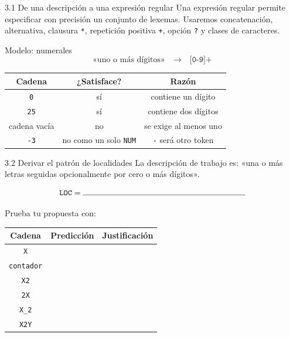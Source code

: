 \documentclass[11pt,spanish]{article}
\newcommand{\blank}[1][4cm]{\rule{#1}{0.4pt}}
\begin{document}
\begin{estacion}{3.1 De una descripción a una expresión regular}
Una expresión regular permite especificar con precisión un conjunto de lexemas. Usaremos concatenación, alternativa, clausura \texttt{*}, repetición positiva \texttt{+}, opción \texttt{?} y clases de caracteres.
\end{estacion}

\begin{modelo}{Modelo: numerales}
\[
\text{«uno o más dígitos»}
\quad\longrightarrow\quad
\texttt{[0-9]+}
\]

\begin{center}
\begin{tabular}{|c|c|c|}
\hline
\textbf{Cadena} & \textbf{¿Satisface?} & \textbf{Razón} \\
\hline
\texttt{0} & sí & contiene un dígito \\
\hline
\texttt{25} & sí & contiene dos dígitos \\
\hline
cadena vacía & no & se exige al menos uno \\
\hline
\texttt{-3} & no como un solo \texttt{NUM} & \texttt{-} será otro token \\
\hline
\end{tabular}
\end{center}
\end{modelo}

\begin{estacion}{3.2 Derivar el patrón de localidades}
La descripción de trabajo es: «una o más letras seguidas opcionalmente por cero o más dígitos».

\[
\texttt{LOC} = \blank[7cm]
\]

Prueba tu propuesta con:

\begin{center}
\begin{tabular}{|c|c|p{}|}
\hline
\textbf{Cadena} & \textbf{Predicción} & \textbf{Justificación} \\
\hline
\texttt{X} & & \\
\hline
\texttt{contador} & & \\
\hline
\texttt{X2} & & \\
\hline
\texttt{2X} & & \\
\hline
\texttt{X\_2} & & \\
\hline
\texttt{X2Y} & & \\
\hline
\end{tabular}
\end{center}
\end{estacion}
\end{document}

